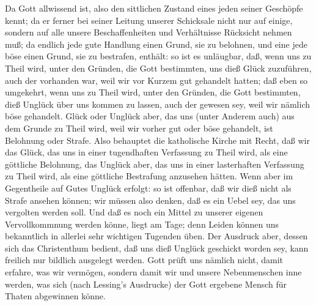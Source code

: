 \begin{aufza}
\item Da Gott allwissend ist, also den sittlichen Zustand eines jeden seiner Geschöpfe kennt; da er ferner bei seiner Leitung unserer Schicksale nicht nur auf einige, sondern auf alle unsere Beschaffenheiten und Verhältnisse Rücksicht nehmen muß; da endlich jede gute Handlung einen Grund, sie zu belohnen, und eine jede böse einen Grund, sie zu bestrafen, enthält: so ist es unläugbar, daß, wenn uns  zu Theil wird, unter den Gründen, die Gott bestimmten, uns dieß Glück zuzuführen, auch der vorhanden war, weil wir vor Kurzem gut gehandelt hatten; daß eben so umgekehrt, wenn uns  zu Theil wird, unter den Gründen, die Gott bestimmten, dieß Unglück über uns kommen zu lassen, auch der gewesen sey, weil wir nämlich böse gehandelt. Glück oder Unglück aber, das uns (unter Anderem auch) aus dem Grunde zu Theil wird, weil wir vorher gut oder böse gehandelt, ist Belohnung oder Strafe. Also behauptet die katholische Kirche mit Recht, daß wir das Glück, das uns in einer tugendhaften Verfassung zu Theil wird, als eine göttliche Belohnung, das Unglück aber, das uns in einer lasterhaften Verfassung zu Theil wird, als eine göttliche Bestrafung anzusehen hätten. Wenn aber im Gegentheile auf Gutes Unglück erfolgt: so ist offenbar, daß wir dieß nicht als Strafe ansehen können; wir müssen also denken, daß es ein Uebel sey, das uns vergolten werden soll. Und daß es noch ein Mittel zu unserer eigenen Vervollkommnung werden könne, liegt am Tage; denn Leiden können uns bekanntlich in allerlei sehr wichtigen Tugenden üben. Der Ausdruck aber, dessen sich das Christenthum bedient, daß uns dieß Unglück  geschickt worden sey, kann freilich nur bildlich ausgelegt werden. Gott prüft uns nämlich nicht, damit  erfahre, was wir vermögen, sondern damit wir und unsere Nebenmenschen inne werden, was sich (nach Lessing's Ausdrucke) der Gott ergebene Mensch für Thaten abgewinnen könne.
\end{aufza}

